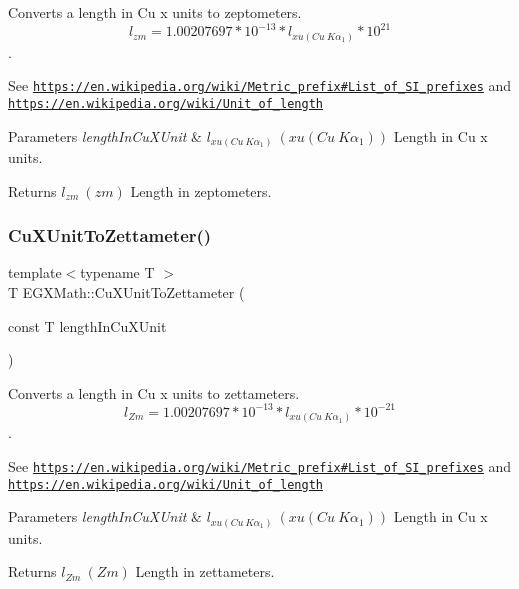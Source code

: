 Converts a length in Cu x units to zeptometers. \[ l_{zm}=1.00207697*10^{-13} * l_{xu(Cu\ K\alpha_1)} * 10^{21} \]. 

See \href{https://en.wikipedia.org/wiki/Metric_prefix#List_of_SI_prefixes}{\tt https\+://en.\+wikipedia.\+org/wiki/\+Metric\+\_\+prefix\#\+List\+\_\+of\+\_\+\+S\+I\+\_\+prefixes} and \href{https://en.wikipedia.org/wiki/Unit_of_length}{\tt https\+://en.\+wikipedia.\+org/wiki/\+Unit\+\_\+of\+\_\+length} 
\begin{DoxyParams}{Parameters}
{\em length\+In\+Cu\+X\+Unit} & $ l_{xu(Cu\ K\alpha_1)}\ (xu(Cu\ K\alpha_1))$ Length in Cu x units. \\
\hline
\end{DoxyParams}
\begin{DoxyReturn}{Returns}
$ l_{zm}\ (zm)$ Length in zeptometers. 
\end{DoxyReturn}
\mbox{\label{group___e_g_x_math-_conversions-_length_conversions-_non-_s_i-_cu_x_unit-_s_i_ga1c95837914c023ff53343f87b76ac330}} 
\subsubsection{\texorpdfstring{Cu\+X\+Unit\+To\+Zettameter()}{CuXUnitToZettameter()}}
{\footnotesize\ttfamily template$<$typename T $>$ \\
T E\+G\+X\+Math\+::\+Cu\+X\+Unit\+To\+Zettameter (\begin{DoxyParamCaption}\item[{const T}]{length\+In\+Cu\+X\+Unit }\end{DoxyParamCaption})}



Converts a length in Cu x units to zettameters. \[ l_{Zm}=1.00207697*10^{-13} * l_{xu(Cu\ K\alpha_1)} * 10^{-21} \]. 

See \href{https://en.wikipedia.org/wiki/Metric_prefix#List_of_SI_prefixes}{\tt https\+://en.\+wikipedia.\+org/wiki/\+Metric\+\_\+prefix\#\+List\+\_\+of\+\_\+\+S\+I\+\_\+prefixes} and \href{https://en.wikipedia.org/wiki/Unit_of_length}{\tt https\+://en.\+wikipedia.\+org/wiki/\+Unit\+\_\+of\+\_\+length} 
\begin{DoxyParams}{Parameters}
{\em length\+In\+Cu\+X\+Unit} & $ l_{xu(Cu\ K\alpha_1)}\ (xu(Cu\ K\alpha_1))$ Length in Cu x units. \\
\hline
\end{DoxyParams}
\begin{DoxyReturn}{Returns}
$ l_{Zm}\ (Zm)$ Length in zettameters. 
\end{DoxyReturn}
